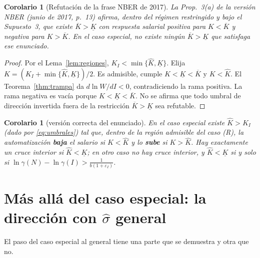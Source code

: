 \documentclass[11pt,a4paper]{article}
\numberwithin{equation}{section}
\theoremstyle{definition}
\theoremstyle{plain}
\newtheorem{corolario}[definicion]{Corolario}
\theoremstyle{remark}
\newcommand{\Kl}{\underline K}
\newcommand{\Kb}{\overline K}
\newcommand{\Kh}{\hat K}
\newcommand{\eps}{\varepsilon}
\newcommand{\sh}{\hat\sigma}
\begin{document}
\begin{corolario}[Refutación de la frase NBER de 2017]\label{cor:falso}
La Prop.~3(a) de la versión NBER (junio de 2017, p.~13) afirma, dentro del régimen restringido y bajo el Supuesto~3,
que existe $\Kb>\Kl$ con respuesta salarial positiva para $K<\Kb$ y negativa para $K>\Kb$.
En el caso especial, no existe ningún $\Kb>\Kl$ que satisfaga ese enunciado.
\end{corolario}
\begin{proof}
Por el Lema~\ref{lem:regiones}, $K_I<\min\{\Kh,\Kl\}$. Elija
$K=(K_I+\min\{\Kh,\Kl\})/2$. Es admisible, cumple $K<\Kl<\Kb$ y $K<\Kh$.
El Teorema~\ref{thm:trampa} da $d\ln W/dI<0$, contradiciendo la rama positiva.
La rama negativa es vacía porque $K<\Kl<\Kb$.
No se afirma que todo umbral de dirección invertida fuera de la restricción $\Kb>\Kl$ sea refutable.
\end{proof}

\begin{corolario}[versión correcta del enunciado]\label{cor:correcto}
En el caso especial existe $\Kh>K_I$ (dado por \eqref{eq:umbrales}) tal que, dentro de la región admisible del
caso (R), la automatización \textbf{baja} el salario si $K<\Kh$ y lo \textbf{sube} si $K>\Kh$. Hay exactamente un cruce interior si $\Kh<\Kl$; en otro caso no hay cruce interior,
y $\Kh<\Kl$ si y solo si $\ln\gamma(N)-\ln\gamma(I)>\frac{1}{b(1+\eps_I)}$.
\end{corolario}

\section{Más allá del caso especial: la dirección con $\sh$ general}

El paso del caso especial al general tiene una parte que se demuestra y otra que no.
\end{document}
